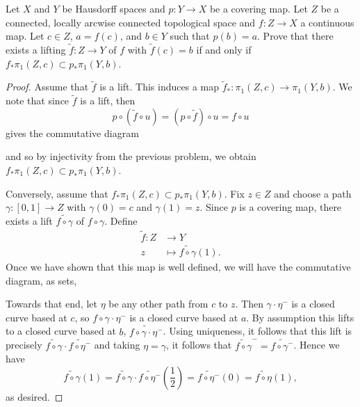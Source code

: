 \documentclass[10pt]{amsart}
\begin{document}
\begin{thm}
  Let $X$ and $Y$ be Hausdorff spaces and $p \colon Y \rightarrow X$ be a covering map.
  Let $Z$ be a connected, locally arcwise connected topological space and $f \colon Z \rightarrow X$ a continuous map.
  Let $c \in Z$, $a = f(c)$, and $b \in Y$ such that $p(b) = a$.
  Prove that there exists a lifting $\tilde{f} \colon Z \rightarrow Y$ of $f$ with $\tilde{f}(c) = b$ if and only if $f_*\pi_1(Z, c) \subset p_*\pi_1(Y,b)$.

  \begin{proof}
    Assume that $\tilde{f}$ is a lift.
    This induces a map $\tilde{f}_* \colon \pi_1(Z,c) \rightarrow \pi_1(Y,b)$.
    We note that since $\tilde{f}$ is a lift, then
    $$p \circ (\tilde{f} \circ u) = (p \circ \tilde{f}) \circ u = f \circ u$$
    gives the commutative diagram
    \begin{center}
    \end{center}
    and so by injectivity from the previous problem, we obtain $f_*\pi_1(Z, c) \subset p_*\pi_1(Y,b)$.
    
    Conversely, assume that $f_*\pi_1(Z, c) \subset p_*\pi_1(Y,b)$.
    Fix $z \in Z$ and choose a path $\gamma \colon [0,1] \rightarrow Z$ with $\gamma(0) = c$ and $\gamma(1) = z$.
    Since $p$ is a covering map, there exists a lift $\widetilde{f \circ \gamma}$ of $f \circ \gamma$.
    Define 
    \begin{align*}
      \tilde{f} \colon Z & \rightarrow Y\\
      z & \mapsto \widetilde{f \circ \gamma}(1).
    \end{align*}
    Once we have shown that this map is well defined, we will have the commutative diagram, as sets,
    \begin{center}
    \end{center}
    Towards that end, let $\eta$ be any other path from $c$ to $z$.
    Then $\gamma \cdot \eta^-$ is a closed curve based at $c$, so $f \circ \gamma \cdot \eta^-$ is a closed curve based at $a$.
    By assumption this lifts to a closed curve based at $b$, $\widetilde{f \circ \gamma \cdot \eta^-}$.
    Using uniqueness, it follows that this lift is precisely $\widetilde{f \circ \gamma} \cdot \widetilde{f \circ \eta^-}$ and taking $\eta = \gamma$, it follows that $\widetilde{f \circ \gamma}^- = \widetilde{f \circ \gamma^-}$.
    Hence we have 
    $$\widetilde{f \circ \gamma}(1) = \widetilde{f \circ \gamma} \cdot \widetilde{f \circ \eta^-}\left(\frac{1}{2}\right) = \widetilde{f \circ \eta^-}(0) = \widetilde{f \circ \eta}(1),$$
    as desired.


\end{proof}
\end{thm}
\end{document}
